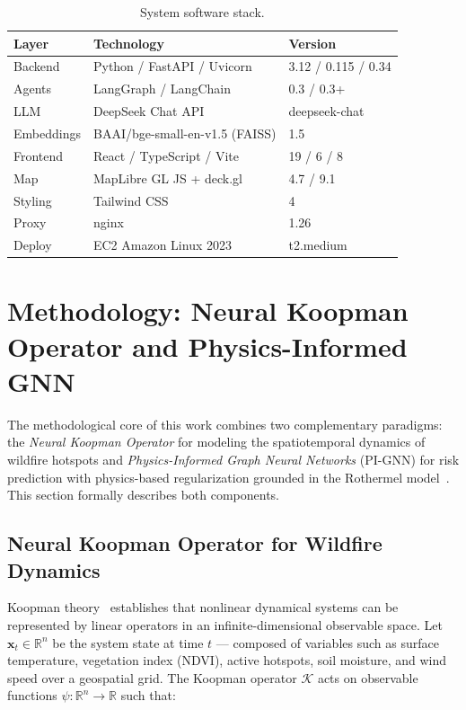 \documentclass[preprint,12pt,times,numbers]{elsarticle}
\begin{document}
\begin{table}[htbp]
\centering
\caption{System software stack.}
\label{tab:software-stack}
\small
\begin{tabular}{@{}lll@{}}
\toprule
\textbf{Layer} & \textbf{Technology} & \textbf{Version} \\
\midrule
Backend & Python / FastAPI / Uvicorn & 3.12 / 0.115 / 0.34 \\
Agents & LangGraph / LangChain & 0.3 / 0.3+ \\
LLM & DeepSeek Chat API & deepseek-chat \\
Embeddings & BAAI/bge-small-en-v1.5 (FAISS) & 1.5 \\
Frontend & React / TypeScript / Vite & 19 / 6 / 8 \\
Map & MapLibre GL JS + deck.gl & 4.7 / 9.1 \\
Styling & Tailwind CSS & 4 \\
Proxy & nginx & 1.26 \\
Deploy & EC2 Amazon Linux 2023 & t2.medium \\
\bottomrule
\end{tabular}
\end{table}

\section{Methodology: Neural Koopman Operator and Physics-Informed GNN}
\label{sec:methodology}

The methodological core of this work combines two complementary paradigms: the \emph{Neural Koopman Operator} for modeling the spatiotemporal dynamics of wildfire hotspots and \emph{Physics-Informed Graph Neural Networks} (PI-GNN) for risk prediction with physics-based regularization grounded in the Rothermel model~\cite{article:rothermel1972}. This section formally describes both components.

\subsection{Neural Koopman Operator for Wildfire Dynamics}
\label{sec:koopman}

Koopman theory~\cite{article:koopman1931,article:rowley2009,article:mezic2013} establishes that nonlinear dynamical systems can be represented by linear operators in an infinite-dimensional observable space. Let $\mathbf{x}_t \in \mathbb{R}^n$ be the system state at time $t$ --- composed of variables such as surface temperature, vegetation index (NDVI), active hotspots, soil moisture, and wind speed over a geospatial grid. The Koopman operator $\mathcal{K}$ acts on observable functions $\psi: \mathbb{R}^n \to \mathbb{R}$ such that:
\end{document}

